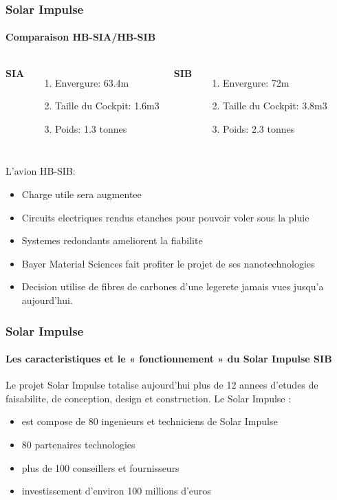 \documentclass{beamer}
\begin{document}
\begin{frame}
\frametitle{Solar Impulse}
\framesubtitle{Comparaison HB-SIA/HB-SIB}

\begin{columns}[c] %

\textbf{SIA}
\begin{enumerate}
\item Envergure: 63.4m
\item Taille du Cockpit: 1.6m3
\item Poids: 1.3 tonnes
\end{enumerate}

\textbf{SIB}
\begin{enumerate}
\item Envergure: 72m
\item Taille du Cockpit: 3.8m3
\item Poids: 2.3 tonnes
\end{enumerate}

\end{columns}

L'avion HB-SIB:
\begin{itemize}
\item Charge utile sera augmentee
\item Circuits electriques rendus etanches pour pouvoir voler sous la pluie
\item Systemes redondants ameliorent la fiabilite
\item Bayer Material Sciences fait profiter le projet de ses nanotechnologies 
\item Decision utilise de fibres de carbones d'une legerete jamais vues jusqu'a aujourd'hui.
\end{itemize}
\end{frame}




\begin{frame}
\frametitle{Solar Impulse}
\framesubtitle{Les caracteristiques et le  « fonctionnement » du Solar Impulse SIB}

Le projet Solar Impulse totalise aujourd'hui plus de 12 annees d'etudes de faisabilite, de conception, design et construction. Le Solar Impulse :\\

\begin{itemize}
\item est compose de 80 ingenieurs et techniciens de Solar Impulse
\item 80 partenaires technologies
\item plus de 100 conseillers et fournisseurs
\item investissement d'environ 100 millions d'euros


\end{itemize}

\end{frame}
\end{document}
